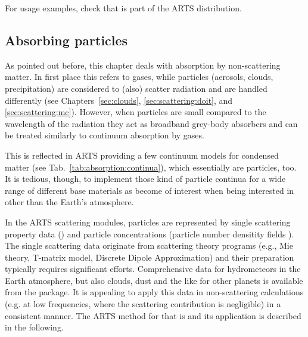 For usage examples, check  that
is part of the ARTS distribution.

\subsection{Absorbing particles}
\label{sec:absorption:particles}

As pointed out before, this chapter deals with absorption by non-scattering
matter. In first place this refers to gases, while particles (aerosols, clouds,
precipitation) are considered to (also) scatter radiation and are handled
differently (see Chapters~\ref{sec:clouds}, \ref{sec:scattering:doit}, and
\ref{sec:scattering:mc}).
However, when particles are small compared to the wavelength of the radiation
they act as broadband grey-body absorbers and can be treated similarly to
continuum absorption by gases.

This is reflected in ARTS providing a few continuum models for condensed
matter (see Tab.~\ref{tab:absorption:continua}), which essentially are
particles, too.
It is tedious, though, to implement those kind of particle continua for a wide
range of different base materials as become of interest when being interested in
other than the Earth's atmosphere.

In the ARTS scattering modules, particles are represented by single scattering
property data () and particle concentrations
(particle number densitity fields ).
The single scattering data originate from scattering theory
programs (e.g., Mie theory, T-matrix model, Discrete Dipole Approximation) and
their preparation typically requires significant efforts. Comprehensive data for
hydrometeors in the Earth atmosphere, but also clouds, dust and the like for
other planets is available from the  package.
It is appealing to apply this data in non-scattering calculations (e.g. at low
frequencies, where the scattering contribution is negligible) in a consistent
manner. The ARTS method for that is  and
its application is described in the following.

